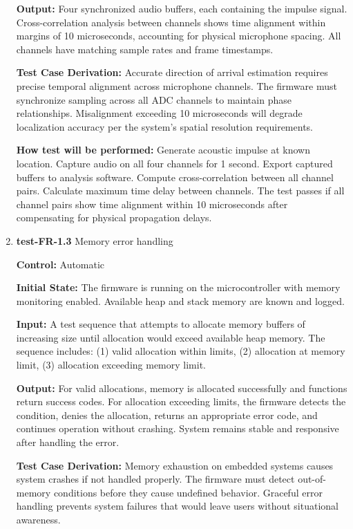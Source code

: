 \documentclass[12pt, titlepage]{article}
\begin{document}
\begin{enumerate}
\textbf{Output:}
Four synchronized audio buffers, each containing the impulse signal. Cross-correlation 
analysis between channels shows time alignment within margins of 10 microseconds, 
accounting for physical microphone spacing. All channels have matching sample 
rates and frame timestamps.

\textbf{Test Case Derivation:} 
Accurate direction of arrival estimation requires precise temporal alignment 
across microphone channels. The firmware must synchronize sampling across all 
ADC channels to maintain phase relationships. Misalignment exceeding 10 
microseconds will degrade localization accuracy per the system's spatial 
resolution requirements.
					
\textbf{How test will be performed:}
Generate acoustic impulse at known location. Capture audio on all four channels 
for 1 second. Export captured buffers to analysis software. Compute cross-correlation 
between all channel pairs. Calculate maximum time delay between channels. The 
test passes if all channel pairs show time alignment within 10 microseconds after 
compensating for physical propagation delays.

\item{\textbf{test-FR-1.3} Memory error handling\\}

\textbf{Control:} Automatic
					
\textbf{Initial State:} 
The firmware is running on the microcontroller with memory monitoring enabled. 
Available heap and stack memory are known and logged.
					
\textbf{Input:}
A test sequence that attempts to allocate memory buffers of increasing size 
until allocation would exceed available heap memory. The sequence includes: 
(1) valid allocation within limits, (2) allocation at memory limit, (3) 
allocation exceeding memory limit.
					
\textbf{Output:}
For valid allocations, memory is allocated successfully and functions return 
success codes. For allocation exceeding limits, the firmware detects the 
condition, denies the allocation, returns an appropriate error code, and 
continues operation without crashing. System remains stable and responsive 
after handling the error.

\textbf{Test Case Derivation:} 
Memory exhaustion on embedded systems causes system crashes if not handled 
properly. The firmware must detect out-of-memory conditions before they cause 
undefined behavior. Graceful error handling prevents system failures that would 
leave users without situational awareness.
					

\end{enumerate}
\end{document}
